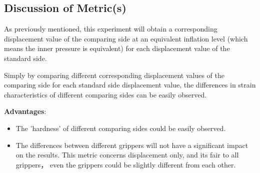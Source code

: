 \documentclass[conference]{IEEEtran}
\begin{document}
\subsection{Discussion of Metric(s)}

As previously mentioned, this experiment will obtain a corresponding displacement value of the comparing side at an equivalent inflation level (which means the inner pressure is equivalent) for each displacement value of the standard side.

 Simply by comparing different corresponding displacement values of the comparing side for each standard side displacement value, the differences in strain characteristics of different comparing sides can be easily observed.

 \textbf{Advantages}:
 \begin{itemize}
     \item The 'hardness' of different comparing sides could be easily observed.
     \item The differences between different grippers will not have a significant impact on the results. This metric concerns displacement only, and its fair to all grippers， even the grippers could be slightly different from each other.
 \end{itemize}
 
\end{document}
